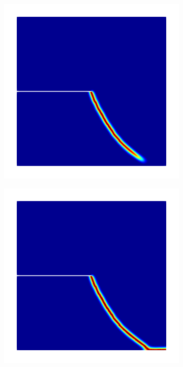 \begin{figure}[htb!]
\begin{subfigure}[b]{0.21\textwidth}
    \caption{}
  \end{subfigure}
  \begin{subfigure}[b]{0.21\textwidth}
    \centering
    \includegraphics[width=\textwidth,scale=0.5]{Chapter4/figures/mode2_notched_plate_spectral_intermediate.png}
    \caption{}
    \label{fig: Chapter4/mode2_notched_plate_spectral_intermediate}
  \end{subfigure}
  \begin{subfigure}[b]{0.21\textwidth}
    \centering
    \includegraphics[width=\textwidth,scale=0.5]{Chapter4/figures/mode2_notched_plate_spectral_final.png}

\end{subfigure}
\end{figure}
